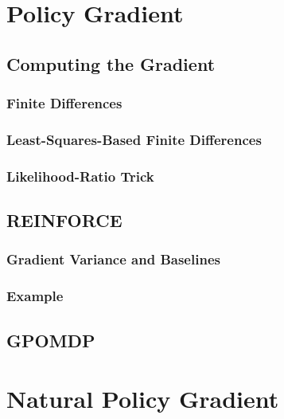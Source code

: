 	\section{Policy Gradient} %

		\subsection{Computing the Gradient} %

			\subsubsection{Finite Differences} %

			\subsubsection{Least-Squares-Based Finite Differences} %

			\subsubsection{Likelihood-Ratio Trick} %

		\subsection{REINFORCE} %

			\subsubsection{Gradient Variance and Baselines} %

			\subsubsection{Example} %

		\subsection{GPOMDP} %

	\section{Natural Policy Gradient} %

